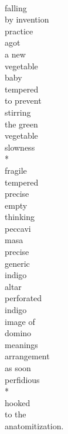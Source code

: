 \documentclass[smalldemyvopaper,11pt,twoside,onecolumn,openright,extrafontsizes]{memoir}
\begin{document}
\\falling
\\by invention
\\practice
\\agot
\\a new
\\vegetable
\\baby
\\tempered
\\to prevent
\\stirring
\\the green
\\vegetable
\\slowness
\\*
\\fragile
\\tempered
\\precise
\\empty
\\thinking
\\peccavi
\\masa
\\precise
\\generic
\\indigo
\\altar
\\perforated
\\indigo
\\image of
\\domino
\\meanings
\\arrangement
\\as soon
\\perfidious
\\*
\\hooked
\\to the
\\anatomitization.
\end{document}
